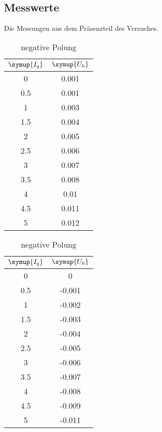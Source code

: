 \subsection{Messwerte}
Die Messungen aus dem Präsenzteil des Versuches.


\begin{table}
    \caption*{\textbf{Hallspannung; Magnetfeld konstant}}
    \begin{minipage}{0.49\textwidth}
          \centering  
          \caption{positive Polung}
          \label{tab:bconst}
          \begin{tabular}{c c}
            \toprule
            $\symup{I_q}$ & $\symup{U_h}$ \\
            \midrule
            0   & 0.001 \\
            0.5 & 0.001 \\
            1   & 0.003 \\
            1.5 & 0.004 \\
            2   & 0.005 \\
            2.5 & 0.006 \\
            3   & 0.007 \\
            3.5 & 0.008 \\
            4   & 0.01  \\
            4.5 & 0.011 \\
            5   & 0.012 \\
            \bottomrule
        \end{tabular}
    \end{minipage}
    \hfill
    \begin{minipage}{0.49\textwidth}
        \centering
          \caption{negative Polung}
          \label{tab:bconst-}
           \begin{tabular}{c c}
            \toprule
            $\symup{I_q}$ & $\symup{U_h}$ \\
            \midrule
            0   &  0     \\
            0.5 & -0.001 \\
            1   & -0.002 \\
            1.5 & -0.003 \\
            2   & -0.004 \\
            2.5 & -0.005 \\
            3   & -0.006 \\
            3.5 & -0.007 \\
            4   & -0.008 \\
            4.5 & -0.009 \\
            5   & -0.011 \\
            \bottomrule
       \end{tabular}
     \end{minipage}
  \end{table}

